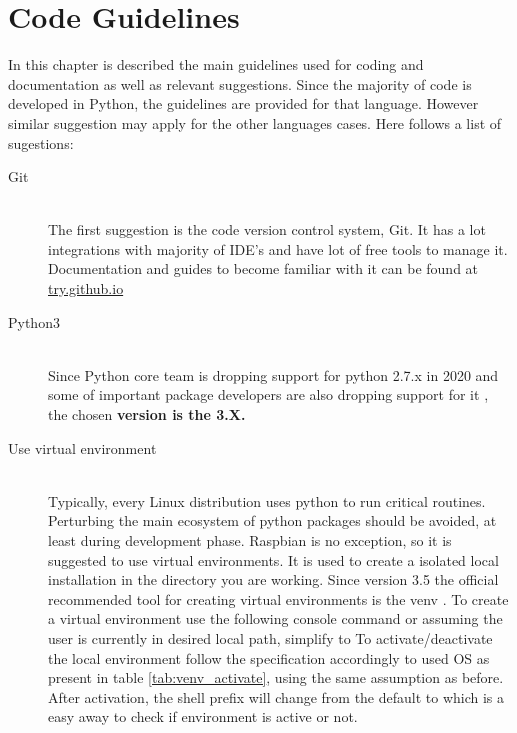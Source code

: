 \chapter{Code Guidelines}
In this chapter is described the main guidelines used for coding and documentation as well as relevant suggestions.
Since the majority of code is developed in Python, the guidelines are provided for that language. However similar suggestion may apply for the other languages cases. Here follows a list of sugestions:
\begin{description}
	\item [Git] \hfill \\The first suggestion is the code version control system, Git. It has a lot integrations with majority of IDE's and have lot of free tools to manage it. Documentation and guides to become familiar with it can be found at \href{https://try.github.io/}{try.github.io}
	\item[Python3] \hfill \\ Since Python core team is dropping support for python 2.7.x in 2020 \cite{python_end_of_life} and some of important package developers are also dropping support for it \cite{numpy_end_of_life}, the chosen \textbf{version is the 3.X.}
	\item[Use virtual environment] \hfill\\ Typically, every Linux distribution uses python to run critical routines. Perturbing the main ecosystem of python packages should be avoided, at least during development phase. Raspbian is no exception, so it is suggested to use virtual environments. It is used to create a isolated local installation in the directory you are working. Since version 3.5 the official recommended tool for creating virtual environments is the venv \cite{python_doc}.
	To create a virtual environment use the following console command  or  assuming the user is currently in desired local path, simplify to  
	To activate/deactivate the local environment follow the specification accordingly to used \gls{OS} as present in table \ref{tab:venv_activate}, using the same assumption as before. After activation, the shell prefix will change from the default to  which is a easy away to check if environment is active or not.
	

\end{description}
